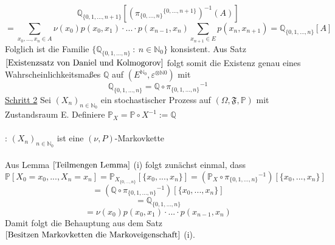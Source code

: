 \begin{equation*}
\mathbb{Q}_{\lbrace 0,1,...,n+1 \rbrace}[({\pi_{\lbrace 0,...,n \rbrace}}^{\lbrace 0,...,n+1 \rbrace})^{-1}(A)]
\end{equation*}
\begin{equation*}
= \sum_{x_{0},...,x_{n} \in A} \nu(x_{0})p(x_{0},x_{1}) \cdot ... \cdot p(x_{n-1},x_{n}) \sum_{x_{n+1} \in E} p(x_{n},x_{n+1}) = \mathbb{Q}_{\lbrace 0,1,...,n \rbrace}[A] 
\end{equation*}
Folglich ist die Familie $\lbrace \mathbb{Q}_{\lbrace 0,1,...,n \rbrace} \: : \: n\in \mathbb{N}_{0}\rbrace$ konsistent. Aus Satz $\ref{Existenzsatz von Daniel und Kolmogorov}$ folgt somit die Existenz genau eines Wahrscheinlichkeitsmaßes $\mathbb{Q}$ auf $(E^{\mathbb{N}_{0}},\varepsilon^{ \otimes \mathbb{N}{0}})$ mit
\begin{equation*}
\mathbb{Q}_{\lbrace 0,1,...,n \rbrace} = \mathbb{Q} \circ {\pi_{\lbrace 0,1,...,n \rbrace}}^{-1}
\end{equation*}
\underline{Schritt 2} Sei $(X_{n})_{n \in \mathbb{N}_{0}}$ ein stochastischer Prozess auf $(\Omega, \mathfrak{F}, \mathbb{P})$ mit Zustandsraum E. Definiere $\mathbb{P}_{X} = \mathbb{P} \circ X^{-1} := \mathbb{Q}$
\\
\\
: $(X_{n})_{n \in \mathbb{N}_{0}}$ ist eine $(\nu,P)$-Markovkette
\\
\\
Aus Lemma $\ref{Teilmengen Lemma}$ (i) folgt zunächst einmal, dass
\begin{equation*}
\mathbb{P}[X_{0} = x_{0},...,X_{n} = x_{n}] = \mathbb{P}_{X_{\lbrace 0,...,n \rbrace}}[\lbrace x_{0},...,x_{n}  \rbrace] = (\mathbb{P}_{X} \circ {\pi_{\lbrace 0,1,...,n \rbrace}}^{-1})[\lbrace x_{0},...,x_{n}  \rbrace]
\end{equation*}
\begin{equation*}
= (\mathbb{Q} \circ {\pi_{\lbrace 0,1,...,n \rbrace}}^{-1})[\lbrace x_{0},...,x_{n}  \rbrace]
\end{equation*}
\begin{equation*}
= \mathbb{Q}_{\lbrace 0,1,...,n \rbrace}
\end{equation*}
\begin{equation*}
= \nu(x_{0})p(x_{0},x_{1}) \cdot ... \cdot p(x_{n-1},x_{n})
\end{equation*}
Damit folgt die Behauptung aus dem Satz $\ref{Besitzen Markovketten die Markoveigenschaft}$ (i).